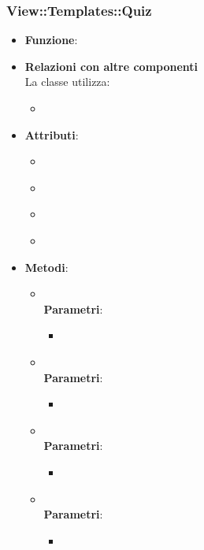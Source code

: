 \subsubsection{View::Templates::Quiz}
\begin{itemize}
\item\textbf{Funzione}:
\item\textbf{Relazioni con altre componenti}\\
La classe utilizza:
	\begin{itemize}
		\item
	\end{itemize}
\item\textbf{Attributi}:
	\begin{itemize}
		\item\code{}\\
		\item\code{}\\
		\item\code{}\\
		\item\code{}\\
	\end{itemize}
\item\textbf{Metodi}:
	\begin{itemize}
		\item\code{}\\
		\textbf{Parametri}:
			\begin{itemize}
				\item\code{}\\
			\end{itemize}
		\item\code{}\\
		\textbf{Parametri}:
			\begin{itemize}
				\item\code{}\\
			\end{itemize}
		\item\code{}\\
		\textbf{Parametri}:
			\begin{itemize}
				\item\code{}\\
			\end{itemize}
		\item\code{}\\
		\textbf{Parametri}:
			\begin{itemize}
				\item\code{}\\
			\end{itemize}
	\end{itemize}
\end{itemize}

